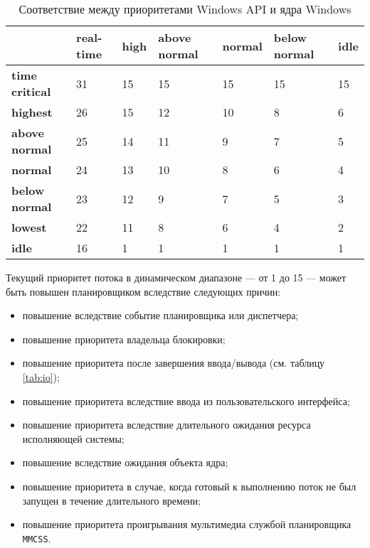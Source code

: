 \documentclass[a4paper,12pt]{bmstu}
\begin{document}
\begin{table}[h]
    \caption{Соответствие между приоритетами Windows API и ядра Windows}
    \begin{center}
        \begin{tabular}{|l|p{45pt}|p{45pt}|p{45pt}|p{45pt}|p{45pt}|p{45pt}|}
            \hline
            {} & \textbf{real-time} & \textbf{high} & \textbf{above normal} & \textbf{normal} & \textbf{below normal} & \textbf{idle}\\
            \hline
            \textbf{time critical} & 31 & 15 & 15 & 15 & 15 & 15 \\
            \hline
            \textbf{highest} & 26 & 15 & 12 & 10 & 8 & 6 \\
            \hline
            \textbf{above normal} & 25 & 14 & 11 & 9 & 7 & 5 \\
            \hline
            \textbf{normal} & 24 & 13 & 10 & 8 & 6 & 4 \\
            \hline
            \textbf{below normal} & 23 & 12 & 9 & 7 & 5 & 3 \\
            \hline
            \textbf{lowest} & 22 & 11 & 8 & 6 & 4 & 2 \\
            \hline
            \textbf{idle} & 16 & 1 & 1 & 1 & 1 & 1 \\
            \hline
        \end{tabular}
    \end{center}
    \label{tbl:priority}
\end{table}


Текущий приоритет потока в динамическом диапазоне --- от 1 до 15 --- может быть повышен планировщиком вследствие следующих причин:

\begin{itemize}
    \item повышение вследствие событие планировщика или диспетчера;
    \item повышение приоритета владельца блокировки;
    \item повышение приоритета после завершения ввода/вывода (см. таблицу \ref{tab:io});
    \item повышение приоритета вследствие ввода из пользовательского интерфейса;
    \item повышение приоритета вследствие длительного ожидания ресурса исполняющей системы;
    \item повышение вследствие ожидания объекта ядра;
    \item повышение приоритета в случае, когда готовый к выполнению поток не был запущен в течение длительного времени;
    \item повышение приоритета проигрывания мультимедиа службой планировщика \texttt{MMCSS}.
\end{itemize}
\end{document}
